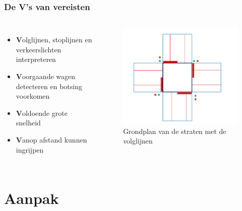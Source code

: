 \documentclass
   [kulak] %
   {kulakbeamer}
\begin{document}
\begin{frame}
\frametitle{De V's van vereisten}
\begin{columns}
	\begin{itemize}
		\item \textbf{V}olglijnen, stoplijnen en verkeerslichten interpreteren
		\item \textbf{V}oorgaande wagen detecteren en botsing voorkomen
		\item \textbf{V}oldoende grote snelheid
		\item \textbf{V}anop afstand kunnen ingrijpen
	\end{itemize}
	
		\begin{figure}
			\centering
			\includegraphics[width=.95\textwidth]{plattegrondStraten}
			\caption{Grondplan van de straten met de volglijnen}%
		\end{figure}
	
\end{columns}

\end{frame}



\section{Aanpak}
\end{document}
